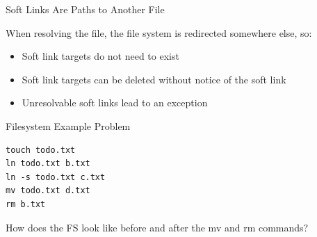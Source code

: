   \begin{frame}{Soft Links Are Paths to Another File}

    \begin{center}
        

    \end{center}

    When resolving the file, the file system is redirected somewhere else, so:
    \begin{itemize}
      \item Soft link targets do not need to exist
      \item Soft link targets can be deleted without notice of the soft link
      \item Unresolvable soft links lead to an exception
    \end{itemize}
  \end{frame}

  \begin{frame}[fragile]{Filesystem Example Problem}
    \begin{lstlisting}
touch todo.txt
ln todo.txt b.txt
ln -s todo.txt c.txt
mv todo.txt d.txt
rm b.txt
    \end{lstlisting}

    \vspace{2em}

    How does the FS look like before and after the mv and rm commands?
  \end{frame}

